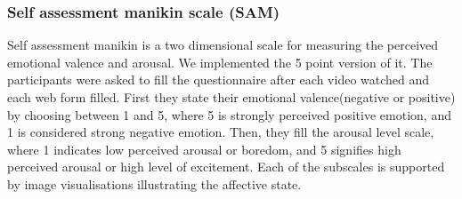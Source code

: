 \documentclass[../main/Feedback.tex]{subfiles}
\begin{document}
\subsubsection{Self assessment manikin scale (SAM)}
Self assessment manikin\cite{bradley1994measuring} is a two dimensional scale for measuring the perceived emotional valence and arousal. We implemented the 5 point version of it. The participants were asked to fill the questionnaire after each video watched and each web form filled. First they state their emotional valence(negative or positive) by choosing between 1 and 5, where 5 is strongly perceived positive emotion, and 1 is considered strong negative emotion. Then, they fill the arousal level scale, where 1 indicates low perceived arousal or boredom, and 5 signifies high perceived arousal or high level of excitement. Each of the subscales is supported by image visualisations illustrating the affective state.
\end{document}
